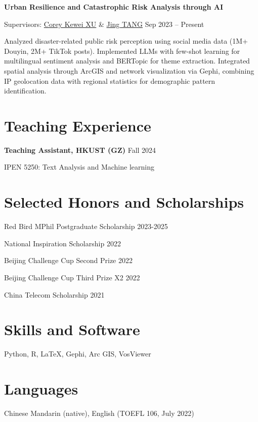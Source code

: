 \documentclass[letterpaper, 11pt]{article}
\newcommand{\sepspace}{\vspace{0.5em}}
\begin{document}
\sepspace
\textbf{Urban Resilience and Catastrophic Risk Analysis through AI}

Supervisors: \href{https://facultyprofiles.hkust-gz.edu.cn/faculty-personal-page/XU-Kewei/coreyxu}{Corey Kewei XU} \& \href{https://facultyprofiles.hkust-gz.edu.cn/faculty-personal-page/TANG-Jing/jingtang}{Jing TANG} \hfill Sep 2023 -- Present

Analyzed disaster-related public risk perception using social media data (1M+ Douyin, 2M+ TikTok posts). Implemented LLMs with few-shot learning for multilingual sentiment analysis and BERTopic for theme extraction. Integrated spatial analysis through ArcGIS and network visualization via Gephi, combining IP geolocation data with regional statistics for demographic pattern identification.

\section{Teaching Experience}
\textbf{Teaching Assistant, HKUST (GZ)} \hfill Fall 2024

IPEN 5250: Text Analysis and Machine learning

\section{Selected Honors and Scholarships}
Red Bird MPhil Postgraduate Scholarship \hfill 2023-2025

National Inspiration Scholarship \hfill 2022

Beijing Challenge Cup Second Prize \hfill 2022

Beijing Challenge Cup Third Prize X2 \hfill 2022

China Telecom Scholarship \hfill 2021

\section{Skills and Software}
Python, R, \LaTeX, Gephi, Arc GIS, VosViewer

\section{Languages}
Chinese Mandarin (native), English (TOEFL 106, July 2022)
\end{document}
